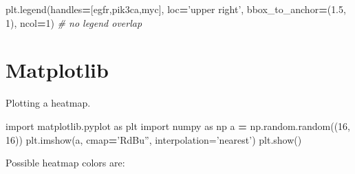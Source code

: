 \documentclass[]{book}
\newenvironment{Shaded}{\begin{snugshade}}{\end{snugshade}}
\newcommand{\DecValTok}[1]{\textcolor[rgb]{0.00,0.00,0.81}{#1}}
\newcommand{\FloatTok}[1]{\textcolor[rgb]{0.00,0.00,0.81}{#1}}
\newcommand{\StringTok}[1]{\textcolor[rgb]{0.31,0.60,0.02}{#1}}
\newcommand{\ImportTok}[1]{#1}
\newcommand{\CommentTok}[1]{\textcolor[rgb]{0.56,0.35,0.01}{\textit{#1}}}
\newcommand{\OperatorTok}[1]{\textcolor[rgb]{0.81,0.36,0.00}{\textbf{#1}}}
\newcommand{\NormalTok}[1]{#1}
\begin{document}
\begin{Shaded}
\begin{Highlighting}[]
\NormalTok{plt.legend(handles}\OperatorTok{=}\NormalTok{[egfr,pik3ca,myc],}
\NormalTok{           loc}\OperatorTok{=}\StringTok{'upper right'}\NormalTok{, bbox_to_anchor}\OperatorTok{=}\NormalTok{(}\FloatTok{1.5}\NormalTok{, }\DecValTok{1}\NormalTok{),}
\NormalTok{           ncol}\OperatorTok{=}\DecValTok{1}\NormalTok{) }\CommentTok{# no legend overlap}
\end{Highlighting}
\end{Shaded}

\section{Matplotlib}\label{matplotlib}

Plotting a heatmap.

\begin{Shaded}
\begin{Highlighting}[]
\ImportTok{import}\NormalTok{ matplotlib.pyplot }\ImportTok{as}\NormalTok{ plt}
\ImportTok{import}\NormalTok{ numpy }\ImportTok{as}\NormalTok{ np}
\NormalTok{a }\OperatorTok{=}\NormalTok{ np.random.random((}\DecValTok{16}\NormalTok{, }\DecValTok{16}\NormalTok{))}
\NormalTok{plt.imshow(a, cmap}\OperatorTok{=}\StringTok{'RdBu'', interpolation='}\NormalTok{nearest}\StringTok{')}
\StringTok{plt.show()}
\end{Highlighting}
\end{Shaded}

Possible heatmap colors are:
\end{document}

